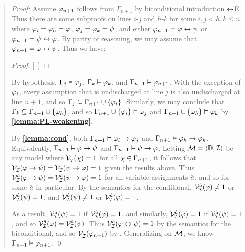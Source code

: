\begin{quote} 
  \textit{Proof:} Assume $\varphi_{n+1}$ follows from $\Gamma_{n+1}$ by biconditional introduction $\leftrightarrow$E.
  Thus there are some subproofs on lines $i$-$j$ and $h$-$k$ for some $i,j<h,k\leq n$ where $\varphi_i=\varphi_h=\varphi$, $\varphi_j=\varphi_k=\psi$, and either $\varphi_{n+1}=\varphi\leftrightarrow\psi$ or $\varphi_{n+1}=\psi\leftrightarrow\varphi$.
  By parity of reasoning, we may assume that $\varphi_{n+1}=\varphi\leftrightarrow\psi$.
  Thus we have:

  \begin{proof}
    \open
       
    \close
    \open
       
    \close
    [\ ]{\metaA \eiff \metaB} 
  \end{proof}

  By hypothesis, $\Gamma_j\vDash \varphi_j$, $\Gamma_k\vDash \varphi_k$, and $\Gamma_{n+1}\vDash \varphi_{n+1}$.
  With the exception of $\varphi_i$, every assumption that is undischarged at line $j$ is also undischarged at line $n+1$, and so $\Gamma_j\subseteq\Gamma_{n+1}\cup\lbrace\varphi_i\rbrace$.
  Similarly, we may conclude that $\Gamma_k\subseteq\Gamma_{n+1}\cup\lbrace\varphi_h\rbrace$, and so $\Gamma_{n+1}\cup\lbrace\varphi_i\rbrace \vDash \varphi_j$ and $\Gamma_{n+1}\cup\lbrace\varphi_h\rbrace \vDash \varphi_k$ by \textbf{\ref{lemma:PL-weakening}}.

  By \textbf{\ref{lemma:cond}}, both $\Gamma_{n+1} \vDash \varphi_i \rightarrow \varphi_j$ and $\Gamma_{n+1} \vDash \varphi_h \rightarrow \varphi_k$.
  Equivalently, $\Gamma_{n+1} \vDash \varphi \rightarrow \psi$ and $\Gamma_{n+1} \vDash \psi \rightarrow \varphi$.
  Letting $\mathcal{M}=\langle\mathbb{D},\mathcal{I}\rangle$ be any model where $\mathcal{V}_{\mathcal{I}}^{}(\chi) = 1$ for all $\chi \in \Gamma_{n+1}$, it follows that $\mathcal{V}_{\mathcal{I}}^{}(\varphi \rightarrow \psi) = \mathcal{V}_{\mathcal{I}}^{}(\psi \rightarrow \varphi) = 1$ given the results above.
  Thus $\mathcal{V}_{\mathcal{I}}^{\hat{a}}(\varphi \rightarrow \psi)=\mathcal{V}_{\mathcal{I}}^{\hat{a}}(\psi \rightarrow \varphi)=1$ for all variable assignments $\hat{a}$, and so for some $\hat{a}$ in particular. 
  By the semantics for the conditional, $\mathcal{V}_{\mathcal{I}}^{\hat{a}}(\varphi)\neq 1$ or $\mathcal{V}_{\mathcal{I}}^{\hat{a}}(\psi)=1$, and $\mathcal{V}_{\mathcal{I}}^{\hat{a}}(\psi)\neq 1$ or $\mathcal{V}_{\mathcal{I}}^{\hat{a}}(\varphi)=1$.

  As a result, $\mathcal{V}_{\mathcal{I}}^{\hat{a}}(\psi)=1$ if $\mathcal{V}_{\mathcal{I}}^{\hat{a}}(\varphi)=1$, and similarly, $\mathcal{V}_{\mathcal{I}}^{\hat{a}}(\varphi)=1$ if $\mathcal{V}_{\mathcal{I}}^{\hat{a}}(\psi)=1$, and so $\mathcal{V}_{\mathcal{I}}^{\hat{a}}(\varphi)=\mathcal{V}_{\mathcal{I}}^{\hat{a}}(\psi)$.
  Thus $\mathcal{V}_{\mathcal{I}}^{\hat{a}}(\varphi \leftrightarrow \psi)=1$ by the semantics for the biconditional, and so $\mathcal{V}_{\mathcal{I}}^{}(\varphi_{n+1})$ by .
  Generalizing on $\mathcal{M}$, we know $\Gamma_{n+1}\vDash\varphi_{n+1}$.
  \qed
\end{quote}





